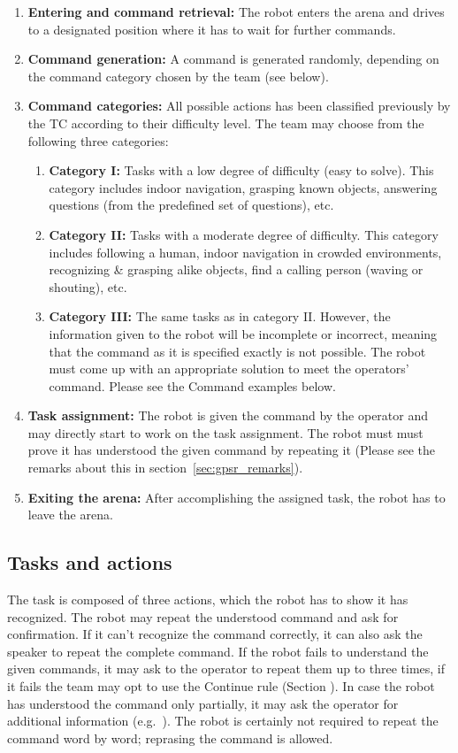 \begin{enumerate}
	\item \textbf{Entering and command retrieval:} The robot enters the arena and drives to a designated position where it has to wait for further commands.
	\item \textbf{Command generation:} A command is generated randomly, depending on the command category chosen by the team (see below). \\

	\item \textbf{Command categories:} All possible actions has been classified previously by the TC according to their difficulty level. The team may choose from the following three categories:
	\begin{enumerate}
		\item \textbf{Category I:} Tasks with a low degree of difficulty (easy to solve). This category includes indoor navigation, grasping known objects, answering questions (from the predefined set of questions), etc.
		\item \textbf{Category II:} Tasks with a moderate degree of difficulty. This category includes following a human, indoor navigation in crowded environments, recognizing \& grasping alike objects, find a calling person (waving or shouting), etc.
		\item \textbf{Category III:} The same tasks as in category II. However, the information given to the robot will be incomplete or incorrect, meaning that the command as it is specified exactly is not possible. The robot must come up with an appropriate solution to meet the operators' command. Please see the Command examples below.
	\end{enumerate}

	\item \textbf{Task assignment:} The robot is given the command by the operator and may directly start to work on the task assignment. The robot must must prove it has understood the given command by repeating it (Please see the remarks about this in section~\ref{sec:gpsr_remarks}).
	\item \textbf{Exiting the arena:} After accomplishing the assigned task, the robot has to leave the arena.
\end{enumerate}

\subsection{Tasks and actions}
The task is composed of three actions, which the robot has to show it has recognized. The robot may repeat the understood command and ask for confirmation. If it can't recognize the command correctly, it can also ask the speaker to repeat the complete command. If the robot fails to understand the given commands, it may ask to the operator to repeat them up to three times, if it fails the team may opt to use the Continue rule (Section ). In case the robot has understood the command only partially, it may ask the operator for additional information (e.g.~).
The robot is certainly not required to repeat the command word by word; reprasing the command is allowed.

